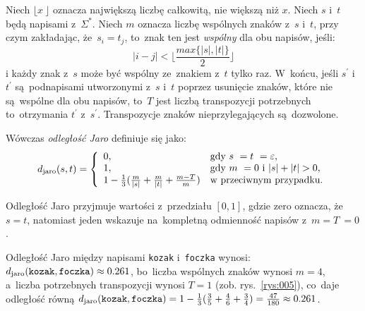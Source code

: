 \documentclass{praca1}
\begin{document}
\begin{definition}
Niech $\lfloor x~\rfloor$ oznacza największą liczbę całkowitą, nie większą niż $x$. Niech $s$ i~$t$ będą napisami z~$\Sigma^*$. Niech $m$ oznacza liczbę wspólnych znaków z~$s$ i~$t$, przy czym zakładając, że~$s_i = t_j$, to~znak ten jest \emph{wspólny} dla obu napisów, jeśli:
\begin{equation*}
|i -j| < \Bigg\lfloor\frac{max\{|s|, |t|\}}{2}\Bigg\rfloor
\end{equation*}
i każdy znak z~$s$ może być wspólny ze~znakiem z~$t$ tylko raz. W~końcu, jeśli $s^\prime$ i~$t^\prime$ są~podnapisami utworzonymi z~$s$ i~$t$ poprzez usunięcie znaków, które nie są~wspólne dla obu napisów, to~$T$ jest liczbą transpozycji potrzebnych to~otrzymania $t^\prime$ z~$s^\prime$. Transpozycje znaków nieprzylegających są~dozwolone.

Wówczas \emph{odległość Jaro} definiuje się jako:
\begin{equation}
\label{eq:011}
d_{\mathrm{jaro}}(s,t) = \left\{
\begin{array}{l l}     
    0, & \text{gdy } s~= t~= \varepsilon, \\
    1, & \text{gdy } m~= 0 \text{ i~} |s| + |t| > 0, \\
    1 - \frac{1}{3} (\frac{m}{|s|} + \frac{m}{|t|} + \frac{m - T}{m}) & \text{w przeciwnym przypadku}.
\end{array}\right.
\end{equation}
\end{definition}

Odległość Jaro przyjmuje wartości z~przedziału $[0,1]$, gdzie zero oznacza, że~$s = t$, natomiast jeden wskazuje na~kompletną odmienność napisów z~$m = T~= 0$.

\begin{example}
Odległość Jaro między napisami \verb|kozak| i~\verb|foczka| wynosi: $d_{\mathrm{jaro}}(\verb|kozak|, \verb|foczka|)  \approx 0.261$, bo~liczba wspólnych znaków wynosi $m = 4$, a~liczba potrzebnych transpozycji wynosi $T = 1$ (zob. rys.~\ref{rys:005}), co~daje odległość równą $d_{\mathrm{jaro}}(\verb|kozak|, \verb|foczka|) = 1 - \frac{1}{3}(\frac{3}{5} + \frac{4}{6} + \frac{3}{4}) = \frac{47}{180} \approx 0.261$.
\end{example}
\end{document}
